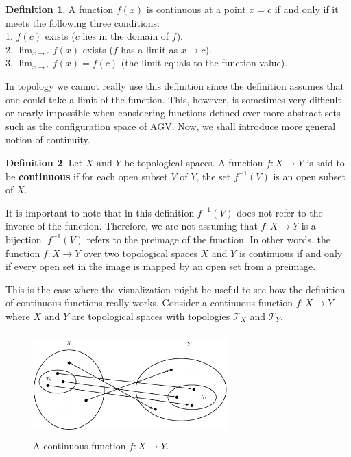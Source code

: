 \documentclass[12pt]{article}
\newcommand{\topology}{\mathcal{T}}              %
\newcommand{\rarr}{\rightarrow}                  %
\theoremstyle{definition}
\newtheorem*{definition}{Definition}
\begin{document}
\begin{definition}
\cite{5} A function $f(x)$ is continuous at a point $x = c$ if and only if it meets the following
three conditions:\\
1. $f(c)$ exists ($c$ lies in the domain of $f$).\\
2. $\lim_{x \to c}f(x)$ exists ($f$ has a limit as $x \to c$).\\
3. $\lim_{x \to c}f(x) = f(c)$ (the limit equals to the function value).
\end{definition}

In topology we cannot really use this definition since the definition assumes
that one could take a limit of the function. This, however, is sometimes very difficult or nearly impossible
when considering functions defined over more abstract sets such as the configuration space
of AGV. Now, we shall introduce more general notion of continuity.

\begin{definition}
\cite{6} Let $X$ and $Y$ be topological spaces. A function $f : X \to Y$ is said to be \textbf{continuous} if
for each open subset $V$ of $Y$, the set $f^{-1}(V)$ is an open subset of $X$.
\end{definition}

It is important to note that in this definition $f^{-1}(V)$ does not refer to the inverse of the function.
Therefore, we are not assuming that $f : X \rarr Y$ is a bijection. $f^{-1}(V)$ refers to the preimage of the function.
In other words, the function $f : X \to Y$ over two topological spaces $X$ and $Y$ is continuous if and only if every open
set in the image is mapped by an open set from a preimage.

\bigskip

This is the case where the visualization might be useful to see how the definition of continuous functions really works.
Consider a continuous function $f : X \to Y$ where $X$ and $Y$ are topological spaces with topologies $\topology_X$ and $\topology_Y$.

\begin{figure}[H]
    \centering
    \includegraphics[width=7.5cm, height=4cm]{continuous-function}
    \caption*{A continuous function $f : X \to Y$.}
\end{figure}
\end{document}
